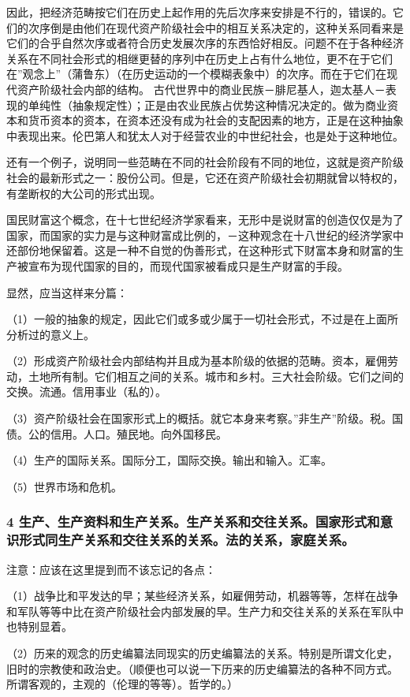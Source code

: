 \documentclass[a4paper,twoside,12pt]{ctexart}
\begin{document}
因此，把经济范畴按它们在历史上起作用的先后次序来安排是不行的，错误的。它们的次序倒是由他们在现代资产阶级社会中的相互关系决定的，这种关系同看来是它们的合乎自然次序或者符合历史发展次序的东西恰好相反。问题不在于各种经济关系在不同社会形式的相继更替的序列中在历史上占有什么地位，更不在于它们在”观念上”（蒲鲁东）（在历史运动的一个模糊表象中）的次序。而在于它们在现代资产阶级社会内部的结构。
古代世界中的商业民族－腓尼基人，迦太基人－表现的单纯性（抽象规定性）；正是由农业民族占优势这种情况决定的。做为商业资本和货币资本的资本，在资本还没有成为社会的支配因素的地方，正是在这种抽象中表现出来。伦巴第人和犹太人对于经营农业的中世纪社会，也是处于这种地位。

还有一个例子，说明同一些范畴在不同的社会阶段有不同的地位，这就是资产阶级社会的最新形式之一：股份公司。但是，它还在资产阶级社会初期就曾以特权的，有垄断权的大公司的形式出现。

国民财富这个概念，在十七世纪经济学家看来，无形中是说财富的创造仅仅是为了国家，而国家的实力是与这种财富成比例的，－这种观念在十八世纪的经济学家中还部份地保留着。这是一种不自觉的伪善形式，在这种形式下财富本身和财富的生产被宣布为现代国家的目的，而现代国家被看成只是生产财富的手段。

显然，应当这样来分篇：

（1）一般的抽象的规定，因此它们或多或少属于一切社会形式，不过是在上面所分析过的意义上。

（2）形成资产阶级社会内部结构并且成为基本阶级的依据的范畴。资本，雇佣劳动，土地所有制。它们相互之间的关系。城市和乡村。三大社会阶级。它们之间的交换。流通。信用事业（私的）。

（3）资产阶级社会在国家形式上的概括。就它本身来考察。”非生产”阶级。税。国债。公的信用。人口。殖民地。向外国移民。

（4）生产的国际关系。国际分工，国际交换。输出和输入。汇率。

（5）世界市场和危机。

\subsubsection{4 生产、生产资料和生产关系。生产关系和交往关系。国家形式和意识形式同生产关系和交往关系的关系。法的关系，家庭关系。}

注意：应该在这里提到而不该忘记的各点：

（1）战争比和平发达的早；某些经济关系，如雇佣劳动，机器等等，怎样在战争和军队等等中比在资产阶级社会内部发展的早。生产力和交往关系的关系在军队中也特别显着。

（2）历来的观念的历史编纂法同现实的历史编纂法的关系。特别是所谓文化史，旧时的宗教使和政治史。（顺便也可以说一下历来的历史编纂法的各种不同方式。所谓客观的，主观的（伦理的等等）。哲学的。）
\end{document}
